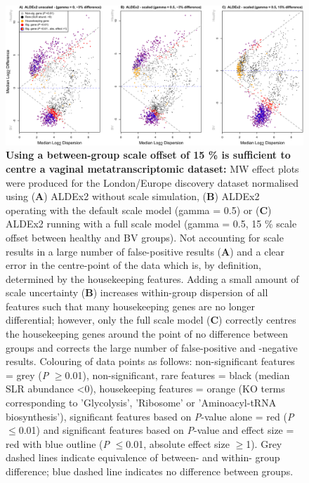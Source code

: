 \documentclass[sn-mathphys,Numbered]{sn-jnl}%
\begin{document}
\begin{figure}[H]
	\centering
	\includegraphics[scale = 0.88]{0_supplFig0.png}
	\caption{\textbf{Using a between-group scale offset of 15 \% is sufficient to centre a vaginal metatranscriptomic dataset:} MW effect plots were produced for the London/Europe discovery dataset normalised using (\textbf{A}) ALDEx2 without scale simulation, (\textbf{B}) ALDEx2 operating with the default scale model (gamma = 0.5) or (\textbf{C}) ALDEx2 running with a full scale model (gamma = 0.5, 15 \% scale offset between healthy and BV groups). Not accounting for scale results in a large number of false-positive results (\textbf{A}) and a clear error in the centre-point of the data which is, by definition, determined by the housekeeping features. Adding a small amount of scale uncertainty (\textbf{B}) increases within-group dispersion of all features such that many housekeeping genes are no longer differential; however, only the full scale model (\textbf{C}) correctly centres the housekeeping genes around the point of no difference between groups and corrects the large number of false-positive and -negative results. Colouring of data points as follows: non-significant features = grey (\textit{P} $\geq$0.01), non-significant, rare features = black (median SLR abundance <0), housekeeping features = orange (KO terms corresponding to 'Glycolysis', 'Ribosome' or 'Aminoacyl-tRNA biosynthesis'), significant features based on \textit{P}-value alone = red (\textit{P} $\leq$0.01) and significant features based on \textit{P}-value and effect size = red with blue outline (\textit{P} $\leq$0.01, absolute effect size $\geq$1). Grey dashed lines indicate equivalence of between- and within- group difference; blue dashed line indicates no difference between groups.} \label{fig:sfigScaleMWplots}
\end{figure}
\newpage
\end{document}
